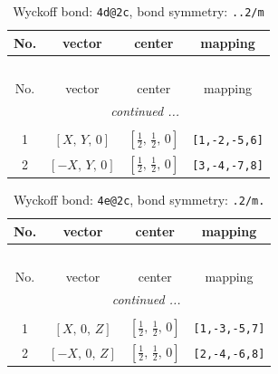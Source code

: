 \documentclass[fleqn,8pt]{jsarticle}
\begin{document}
\begin{longtable}{cccc}
\caption{Wyckoff bond: {\tt 4d@2c}, bond symmetry: {\tt ..2/m}}
 \\
 \hline \hline
No. & vector & center & mapping \\ \hline \endfirsthead

\multicolumn{3}{l}{\tablename\ \thetable{}} \\
 \hline \hline
No. & vector & center & mapping \\ \hline \endhead

 \hline \hline
\multicolumn{3}{r}{\footnotesize\it continued ...} \\ \endfoot

 \hline \hline
\multicolumn{3}{r}{} \\ \endlastfoot

1 & $\left[ X,\, Y,\, 0 \right]$ & $\left[ \frac{1}{2},\, \frac{1}{2},\, 0 \right]$ & {\tt [1,-2,-5,6]} \\ \hline
2 & $\left[ - X,\, Y,\, 0 \right]$ & $\left[ \frac{1}{2},\, \frac{1}{2},\, 0 \right]$ & {\tt [3,-4,-7,8]} \\
\end{longtable}
\renewcommand{\arraystretch}{1.2}
\begin{longtable}{cccc}
\caption{Wyckoff bond: {\tt 4e@2c}, bond symmetry: {\tt .2/m.}}
 \\
 \hline \hline
No. & vector & center & mapping \\ \hline \endfirsthead

\multicolumn{3}{l}{\tablename\ \thetable{}} \\
 \hline \hline
No. & vector & center & mapping \\ \hline \endhead

 \hline \hline
\multicolumn{3}{r}{\footnotesize\it continued ...} \\ \endfoot

 \hline \hline
\multicolumn{3}{r}{} \\ \endlastfoot

1 & $\left[ X,\, 0,\, Z \right]$ & $\left[ \frac{1}{2},\, \frac{1}{2},\, 0 \right]$ & {\tt [1,-3,-5,7]} \\ \hline
2 & $\left[ - X,\, 0,\, Z \right]$ & $\left[ \frac{1}{2},\, \frac{1}{2},\, 0 \right]$ & {\tt [2,-4,-6,8]} \\
\end{longtable}
\renewcommand{\arraystretch}{1.2}
\end{document}
